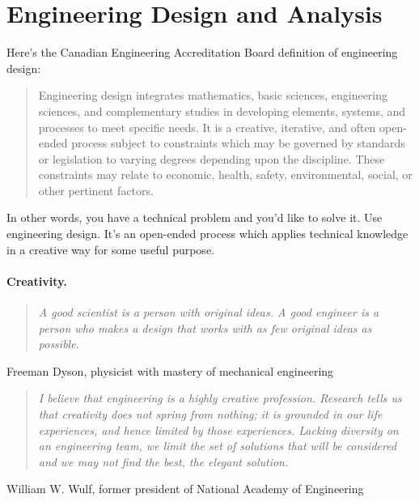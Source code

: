 




\section*{Engineering Design and Analysis}

Here's the Canadian Engineering Accreditation Board definition of
engineering design:
\vspace{-1em}
\begin{quote}
Engineering design integrates mathematics, basic sciences, engineering sciences, and complementary studies in developing elements, systems, and processes to meet specific needs.  It is a creative, iterative, and often open-ended process subject to constraints which may be governed by standards or legislation to varying degrees depending upon the discipline.  These constraints may relate to economic, health, safety, environmental, social, or other pertinent factors.
\end{quote}

In other words, you have a technical problem and you'd like to solve
it.  Use engineering design. It's an open-ended process which applies
technical knowledge in a creative way for some useful purpose.

\paragraph{Creativity.} 
\begin{quote}
\textit{A good scientist is a person with original ideas.  A good engineer is a person who makes a design that works with as few original ideas as possible.}
\end{quote}
\hfill Freeman Dyson, physicist with mastery of mechanical engineering

\begin{quote}
\textit{I believe that engineering is a highly creative profession. Research tells 
us that creativity does not spring from nothing; it is grounded in our 
life experiences, and hence limited by those experiences. Lacking 
diversity on an engineering team, we limit the set of solutions that 
will be considered and we may not find the best, the \emph{elegant}
solution.}
\end{quote}
\hfill William W. Wulf, former president of National Academy of Engineering

